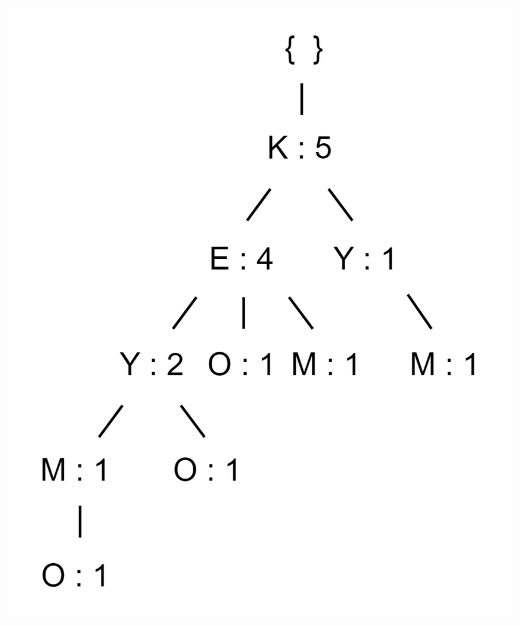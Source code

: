 \documentclass{article}
\begin{document}
\begin{enumerate}[label=(\roman*)]
    \begin{center}\includegraphics[scale=0.25]{Task3_DS_a.png}
    \end{center}


\end{enumerate}
\end{document}
